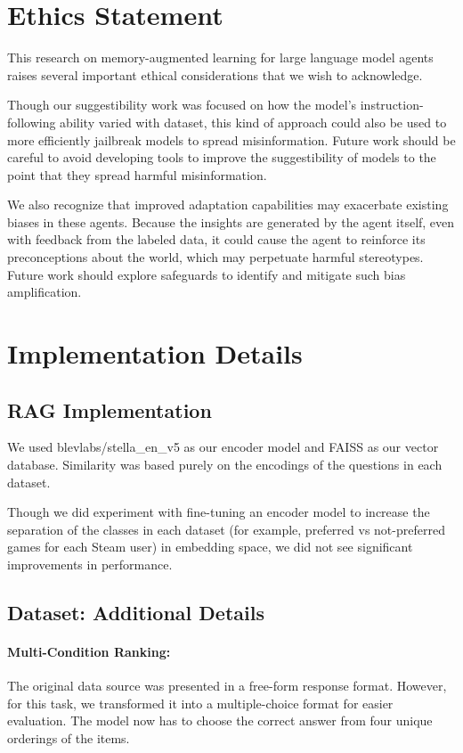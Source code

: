 \appendix

\section{Ethics Statement}

This research on memory-augmented learning for large language model agents raises several important ethical considerations that we wish to acknowledge.

Though our suggestibility work was focused on how the model's instruction-following ability varied with dataset, this kind of approach could also be used to more efficiently jailbreak models to spread misinformation. Future work should be careful to avoid developing tools to improve the suggestibility of models to the point that they spread harmful misinformation.

We also recognize that improved adaptation capabilities may exacerbate existing biases in these agents. Because the insights are generated by the agent itself, even with feedback from the labeled data, it could cause the agent to reinforce its preconceptions about the world, which may perpetuate harmful stereotypes. Future work should explore safeguards to identify and mitigate such bias amplification.

\section{Implementation Details}
\subsection{RAG Implementation}
\label{app:rag_details}
We used blevlabs/stella\_en\_v5 as our encoder model and FAISS as our vector database. Similarity was based purely on the encodings of the questions in each dataset.

Though we did experiment with fine-tuning an encoder model to increase the separation of the classes in each dataset (for example, preferred vs not-preferred games for each Steam user) in embedding space, we did not see significant improvements in performance.

\subsection{Dataset: Additional Details}
\label{app:data}

\paragraph{Multi-Condition Ranking:} The original data source was presented in a free-form response format. However, for this task, we transformed it into a multiple-choice format for easier evaluation. The model now has to choose the correct answer from four unique orderings of the items.


